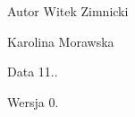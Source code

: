 \begin{DoxyAuthor}{Autor}
Witek Zimnicki 

Karolina Morawska 
\end{DoxyAuthor}
\begin{DoxyDate}{Data}
11.. 
\end{DoxyDate}
\begin{DoxyVersion}{Wersja}
0. 
\end{DoxyVersion}
